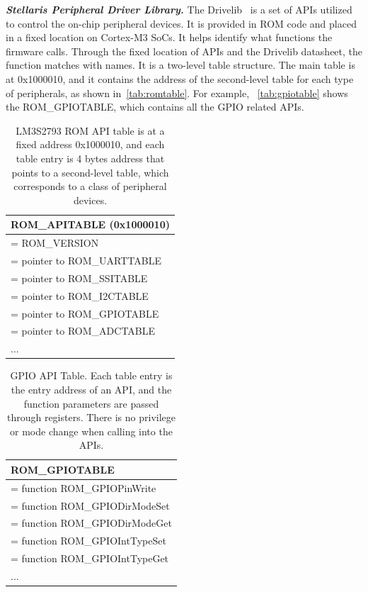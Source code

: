 \textbf{\textit{Stellaris Peripheral Driver Library.}} The Drivelib~\cite{lm3s2793rom} is a set of APIs utilized to control the on-chip peripheral devices. It is provided in ROM code and placed in a fixed location on Cortex-M3 SoCs. It helps identify what functions the firmware calls. Through the fixed location of APIs and the Drivelib datasheet, the function matches with names. It is a two-level table structure. The main table is at 0x1000010, and it contains the address of the second-level table for each type of peripherals, as shown in~\autoref{tab:romtable}. For example, ~\autoref{tab:gpiotable} shows the ROM\_GPIOTABLE, which contains all the GPIO related APIs.

\begin{center}
	\begin{table}
		\small
		\begin{tabular}{|p{7.2cm}|} 
			\hline
			ROM\_APITABLE (0x1000010) \\ [0.5ex] 
			\hline
			[0] = ROM\_VERSION \\
			\hline
			[1] = pointer to ROM\_UARTTABLE \\
			\hline
			[2] = pointer to ROM\_SSITABLE \\
			\hline
			[3] = pointer to ROM\_I2CTABLE \\
			\hline
			[4] = pointer to ROM\_GPIOTABLE \\
			\hline
			[5] = pointer to ROM\_ADCTABLE \\
			\hline
			... \\ 
			\hline
		\end{tabular}
		\caption{LM3S2793 ROM API table is at a fixed address 0x1000010, and each table entry is 4 bytes address that points to a second-level table, which corresponds to a class of peripheral devices.}
		\label{tab:romtable}
	\end{table}
\end{center}

\begin{center}
	\begin{table}
		\small
		\begin{tabular}{|p{7.2cm}|} 
			\hline
			ROM\_GPIOTABLE \\ [0.5ex] 
			\hline
			[0] = function ROM\_GPIOPinWrite \\
			\hline
			[1] = function ROM\_GPIODirModeSet \\
			\hline
			[2] = function ROM\_GPIODirModeGet \\
			\hline
			[3] = function ROM\_GPIOIntTypeSet \\
			\hline
			[4] = function ROM\_GPIOIntTypeGet \\
			\hline
			... \\ 
			\hline
		\end{tabular}
		\caption{GPIO API Table. Each table entry is the entry address of an API, and the function parameters are passed through registers. There is no privilege or mode change when calling into the APIs.}
		\label{tab:gpiotable}
	\end{table}
\end{center}



